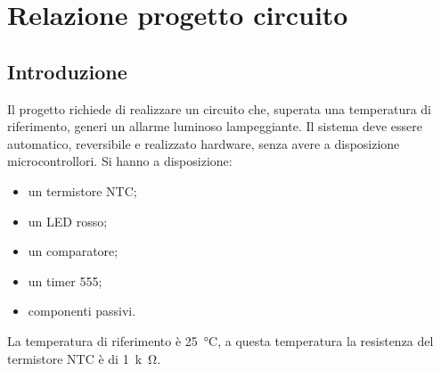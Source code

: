 \documentclass{report}
\begin{document}
\addtocounter{chapter}{+5}
	\begin{frontespizio}
		\Margini{3cm}{3cm}{3cm}{3cm}
		\Punteggiatura{}
		\begin{Preambolo*}
			\usepackage[italian]{babel}
			\usepackage[T1]{fontenc}
			\usepackage[utf8]{inputenc}
			\usepackage{microtype}
			\usepackage{lmodern}
			\graphicspath{{img/}}
			
			\renewcommand{\frontinstitutionfont}{\fontsize{14}{17}\bfseries\scshape}
			\renewcommand{\fronttitlefont}{\fontsize{17}{21}\bfseries\scshape}
			\renewcommand{\frontfootfont}{\fontsize{12}{14}\bfseries\scshape}
		\end{Preambolo*}
	\end{frontespizio}

\newpage
\null
\thispagestyle{empty}
\newpage

\chapter{Relazione progetto circuito}
\section*{Introduzione}
Il progetto richiede di realizzare un circuito che, superata una temperatura di riferimento, generi un allarme luminoso lampeggiante. Il sistema deve essere automatico, reversibile e realizzato hardware, senza avere a disposizione microcontrollori. Si hanno a disposizione:
\begin{itemize}
\item un termistore NTC;
\item un LED rosso;
\item un comparatore;
\item un timer 555;
\item componenti passivi.
\end{itemize}
La temperatura di riferimento è \SI{25}{\celsius}, a questa temperatura la resistenza del termistore NTC è di \SI{1}{k\ohm}.
\end{document}
